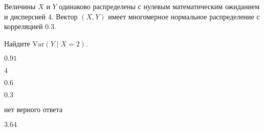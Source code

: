 
\begin{question}
Величины \(X\) и \(Y\) одинаково распределены с нулевым математическим
ожиданием и дисперсией \(4\). Вектор \((X, Y)\) имеет многомерное
нормальное распределение с корреляцией \(0.3\).

Найдите \(\mathrm{Var}(Y\mid X = 2)\).
\begin{answerlist}
  \item \(0.91\)
  \item \(4\)
  \item \(0.6\)
  \item \(0.3\)
  \item нет верного ответа
  \item \(3.64\)
\end{answerlist}
\end{question}


